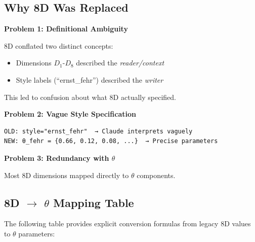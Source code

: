 \subsection{Why 8D Was Replaced}
\label{sec:sw-8d-why}

\textbf{Problem 1: Definitional Ambiguity}

8D conflated two distinct concepts:
\begin{itemize}
    \item Dimensions $D_1$-$D_8$ described the \textit{reader/context}
    \item Style labels (``ernst\_fehr'') described the \textit{writer}
\end{itemize}

This led to confusion about what 8D actually specified.

\textbf{Problem 2: Vague Style Specification}

\begin{verbatim}
OLD: style="ernst_fehr"  → Claude interprets vaguely
NEW: θ_fehr = {0.66, 0.12, 0.08, ...}  → Precise parameters
\end{verbatim}

\textbf{Problem 3: Redundancy with $\theta$}

Most 8D dimensions mapped directly to $\theta$ components.

\subsection{8D $\rightarrow$ $\theta$ Mapping Table}
\label{sec:sw-8d-mapping}

The following table provides explicit conversion formulas from legacy 8D values to $\theta$ parameters:

